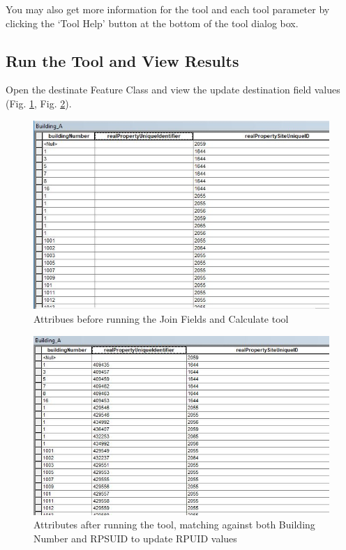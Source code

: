 \documentclass[openany]{book}
\theoremstyle{definition}
\theoremstyle{definition}
\theoremstyle{definition}
\theoremstyle{remark}
\begin{document}
You may also get more information for the tool and each tool parameter
by clicking the `Tool Help' button at the bottom of the tool dialog box.

\subsection{Run the Tool and View
Results}\label{run-the-tool-and-view-results-1}

Open the destinate Feature Class and view the update destination field
values (Fig. \ref{fig:jcbefore}, Fig. \ref{fig:jcafter}).

\begin{figure}[H]

{\centering \includegraphics{figures/joinCalc-before} 

}

\caption{Attribues before running the Join Fields and Calculate tool}\label{fig:jcbefore}
\end{figure}

\begin{figure}[H]

{\centering \includegraphics{figures/joinCalc-results} 

}

\caption{Attributes after running the tool, matching against both Building Number and RPSUID to update RPUID values}\label{fig:jcafter}
\end{figure}
\end{document}
